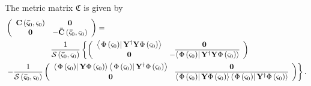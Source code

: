 \documentclass[aps,preprint]{revtex4}%
\begin{document}
The metric matrix $\mathfrak{C}$ is given by
\begin{align}
&  \left(
\begin{array}
[c]{cc}%
\mathbf{C}\left(  \mathbf{\bar{\varsigma}}_{0},\mathbf{\varsigma}_{0}\right)
& \mathbf{0}\\
\mathbf{0} & -\mathbf{\bar{C}}\left(  \mathbf{\bar{\varsigma}}_{0}%
,\mathbf{\varsigma}_{0}\right)
\end{array}
\right)  =\nonumber\\
&  \qquad\qquad\qquad\frac{1}{\mathcal{S}\left(  \mathbf{\bar{\varsigma}}%
_{0},\mathbf{\varsigma}_{0}\right)  }\left\{  \left(
\begin{array}
[c]{cc}%
\left\langle \left.  \Phi\left(  \mathbf{\varsigma}_{0}\right)  \right\vert
\mathbf{Y}^{\dagger}\mathbf{Y}\Phi\left(  \mathbf{\varsigma}_{0}\right)
\right\rangle  & \mathbf{0}\\
\mathbf{0} & -\overline{\left\langle \left.  \Phi\left(  \mathbf{\varsigma
}_{0}\right)  \right\vert \mathbf{Y}^{\dagger}\mathbf{Y}\Phi\left(
\mathbf{\varsigma}_{0}\right)  \right\rangle }%
\end{array}
\right)  \right. \nonumber\\
&  \left.  -\frac{1}{\mathcal{S}\left(  \mathbf{\bar{\varsigma}}%
_{0},\mathbf{\varsigma}_{0}\right)  }\left(
\begin{array}
[c]{cc}%
\left\langle \left.  \Phi\left(  \mathbf{\varsigma}_{0}\right)  \right\vert
\mathbf{Y}\Phi\left(  \mathbf{\varsigma}_{0}\right)  \right\rangle
\left\langle \left.  \Phi\left(  \mathbf{\varsigma}_{0}\right)  \right\vert
\mathbf{Y}^{\dagger}\Phi\left(  \mathbf{\varsigma}_{0}\right)  \right\rangle
& \mathbf{0}\\
\mathbf{0} & \overline{\left\langle \left.  \Phi\left(  \mathbf{\varsigma}%
_{0}\right)  \right\vert \mathbf{Y}\Phi\left(  \mathbf{\varsigma}_{0}\right)
\right\rangle \left\langle \left.  \Phi\left(  \mathbf{\varsigma}_{0}\right)
\right\vert \mathbf{Y}^{\dagger}\Phi\left(  \mathbf{\varsigma}_{0}\right)
\right\rangle }%
\end{array}
\right)  \right\}  .
\end{align}
%
\end{document}
